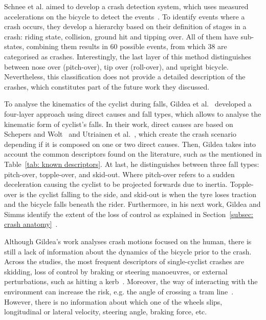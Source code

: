 \documentclass{article}
\begin{document}
Schnee et al. aimed to develop a crash detection system, which uses measured accelerations on the bicycle to detect the events~\cite{Sch21}.
%
To identify events where a crash occurs, they develop a hierarchy based on their definition of stages in a crash: riding state, collision, ground hit and tipping over.
%
All of them have sub-states, combining them results in 60 possible events, from which 38 are categorised as crashes.
%
Interestingly, the last layer of this method distinguishes between nose over (pitch-over), tip over (roll-over), and upright bicycle.
%
Nevertheless, this classification does not provide a detailed description of the crashes, which constitutes part of the future work they discussed.


To analyse the kinematics of the cyclist during falls, Gildea et al.~\cite{Gil21} developed a four-layer approach using direct causes and fall types, which allows to analyse the kinematic form of cyclist's falls.
%
In their work, direct causes are based on Schepers and Wolt~\cite{Sch12} and Utriainen et al.~\cite{Utr20}, which create the crash scenario depending if it is composed on one or two direct causes.
%
Then, Gildea takes into account the common descriptors found on the literature, such as the mentioned in Table~\ref{tab: known descriptors}.
%
At last, he distinguishes between three fall types: pitch-over, topple-over, and skid-out.
%
Where pitch-over refers to a sudden deceleration causing the cyclist to be projected forwards due to inertia.
%
Topple-over is the cyclist falling to the side, and skid-out is when the tyre loses traction and the bicycle falls beneath the rider. 
%
Furthermore, in his next work, Gildea and Simms identify the extent of the loss of control as explained in Section~\ref{subsec: crash anatomy}~\cite{Gil21a}.


Although Gildea's work analyses crash motions focused on the human, there is still a lack of information about the dynamics of the bicycle prior to the crash.
%
Across the studies, the most frequent descriptors of single-cyclist crashes are skidding, loss of control by braking or steering manoeuvres, or external perturbations, such as hitting a kerb~\cite{Alg22, Her18, Sch12, Utr20}.
%
Moreover, the way of interacting with the environment can increase the risk, e.g. the angle of crossing a tram line~\cite{Gil23}.
%
However, there is no information about which one of the wheels slips, longitudinal or lateral velocity, steering angle, braking force, etc.
\end{document}
